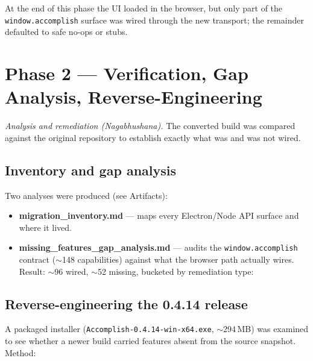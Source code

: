 \documentclass[11pt,a4paper]{article}
\begin{document}
At the end of this phase the UI loaded in the browser, but only part of the
\verb|window.accomplish| surface was wired through the new transport; the
remainder defaulted to safe no-ops or stubs.

\section{Phase 2 --- Verification, Gap Analysis, Reverse-Engineering}
\emph{Analysis and remediation (Nagabhushana).} The converted build was compared
against the original repository to establish exactly what was and was not wired.

\subsection{Inventory and gap analysis}
Two analyses were produced (see Artifacts):
\begin{itemize}[leftmargin=1.4em,topsep=2pt]
  \item \textbf{migration\_inventory.md} --- maps every Electron/Node API surface
        and where it lived.
  \item \textbf{missing\_features\_gap\_analysis.md} --- audits the
        \verb|window.accomplish| contract ($\sim$148 capabilities) against what
        the browser path actually wires. Result: $\sim$96 wired, $\sim$52 missing,
        bucketed by remediation type:
\end{itemize}

\subsection{Reverse-engineering the 0.4.14 release}
A packaged installer (\verb|Accomplish-0.4.14-win-x64.exe|, $\sim$294\,MB) was
examined to see whether a newer build carried features absent from the source
snapshot. Method:
\end{document}
